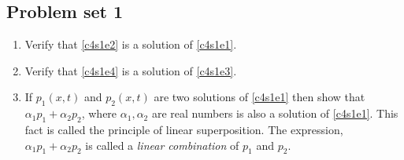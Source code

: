 \subsection{Problem set 1}
\begin{enumerate}
\item Verify that \eqref{c4s1e2} is a solution of \eqref{c4s1e1}.
\item Verify that \eqref{c4s1e4} is a solution of \eqref{c4s1e3}.
\item If $p_1(x, t)$ and $p_2(x, t)$ are two solutions of \eqref{c4s1e1} then
show that $\alpha_1 p_1 + \alpha_2 p_2$, where $\alpha_1, \alpha_2$ are real
numbers is also a solution of \eqref{c4s1e1}.
This fact is called the principle of linear superposition. The expression, 
$\alpha_1 p_1 + \alpha_2 p_2$ is called a \emph{linear combination} of $p_1$
and $p_2$.
\end{enumerate}

